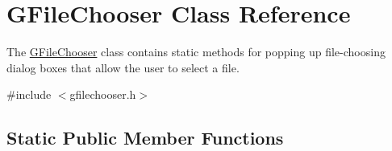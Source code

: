 \hypertarget{classsgl_1_1GFileChooser}{}\section{G\+File\+Chooser Class Reference}
\label{classsgl_1_1GFileChooser}


The \mbox{\hyperlink{classsgl_1_1GFileChooser}{G\+File\+Chooser}} class contains static methods for popping up file-\/choosing dialog boxes that allow the user to select a file.  




{\ttfamily \#include $<$gfilechooser.\+h$>$}

\subsection*{Static Public Member Functions}
